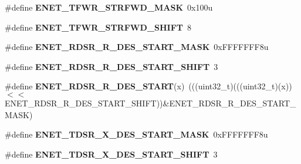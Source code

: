 \begin{DoxyCompactItemize}
\item 
\#define {\bfseries E\+N\+E\+T\+\_\+\+T\+F\+W\+R\+\_\+\+S\+T\+R\+F\+W\+D\+\_\+\+M\+A\+SK}~0x100u\hypertarget{group__ENET__Register__Masks_gafbad9065556d81ffdbabd31915eb15b9}{}\label{group__ENET__Register__Masks_gafbad9065556d81ffdbabd31915eb15b9}

\item 
\#define {\bfseries E\+N\+E\+T\+\_\+\+T\+F\+W\+R\+\_\+\+S\+T\+R\+F\+W\+D\+\_\+\+S\+H\+I\+FT}~8\hypertarget{group__ENET__Register__Masks_ga4b3c1b7265098b5395df3ed3679058a0}{}\label{group__ENET__Register__Masks_ga4b3c1b7265098b5395df3ed3679058a0}

\item 
\#define {\bfseries E\+N\+E\+T\+\_\+\+R\+D\+S\+R\+\_\+\+R\+\_\+\+D\+E\+S\+\_\+\+S\+T\+A\+R\+T\+\_\+\+M\+A\+SK}~0x\+F\+F\+F\+F\+F\+F\+F8u\hypertarget{group__ENET__Register__Masks_gab49b1d2ba8d51579828593849f9f9f0d}{}\label{group__ENET__Register__Masks_gab49b1d2ba8d51579828593849f9f9f0d}

\item 
\#define {\bfseries E\+N\+E\+T\+\_\+\+R\+D\+S\+R\+\_\+\+R\+\_\+\+D\+E\+S\+\_\+\+S\+T\+A\+R\+T\+\_\+\+S\+H\+I\+FT}~3\hypertarget{group__ENET__Register__Masks_ga1afaef178575034556d8e580d5fe0c84}{}\label{group__ENET__Register__Masks_ga1afaef178575034556d8e580d5fe0c84}

\item 
\#define {\bfseries E\+N\+E\+T\+\_\+\+R\+D\+S\+R\+\_\+\+R\+\_\+\+D\+E\+S\+\_\+\+S\+T\+A\+RT}(x)~(((uint32\+\_\+t)(((uint32\+\_\+t)(x))$<$$<$E\+N\+E\+T\+\_\+\+R\+D\+S\+R\+\_\+\+R\+\_\+\+D\+E\+S\+\_\+\+S\+T\+A\+R\+T\+\_\+\+S\+H\+I\+FT))\&E\+N\+E\+T\+\_\+\+R\+D\+S\+R\+\_\+\+R\+\_\+\+D\+E\+S\+\_\+\+S\+T\+A\+R\+T\+\_\+\+M\+A\+SK)\hypertarget{group__ENET__Register__Masks_ga49d871cbe8f6320beb777362b427fea6}{}\label{group__ENET__Register__Masks_ga49d871cbe8f6320beb777362b427fea6}

\item 
\#define {\bfseries E\+N\+E\+T\+\_\+\+T\+D\+S\+R\+\_\+\+X\+\_\+\+D\+E\+S\+\_\+\+S\+T\+A\+R\+T\+\_\+\+M\+A\+SK}~0x\+F\+F\+F\+F\+F\+F\+F8u\hypertarget{group__ENET__Register__Masks_ga0fd3699cfea6036741e57fde2c14259b}{}\label{group__ENET__Register__Masks_ga0fd3699cfea6036741e57fde2c14259b}

\item 
\#define {\bfseries E\+N\+E\+T\+\_\+\+T\+D\+S\+R\+\_\+\+X\+\_\+\+D\+E\+S\+\_\+\+S\+T\+A\+R\+T\+\_\+\+S\+H\+I\+FT}~3\hypertarget{group__ENET__Register__Masks_ga46f0734fb316af30bafaaaf1f33cc24a}{}\label{group__ENET__Register__Masks_ga46f0734fb316af30bafaaaf1f33cc24a}


\end{DoxyCompactItemize}
